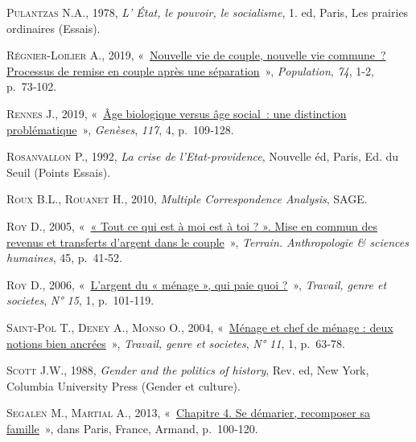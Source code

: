 \documentclass[
  12pt,
]{book}
\newlength{\cslhangindent}
\newenvironment{CSLReferences}[2] %
 {\begin{list}{}{%
  \setlength{\itemindent}{0pt}
  \setlength{\leftmargin}{0pt}
  \setlength{\parsep}{0pt}
  \ifodd #1
   \setlength{\leftmargin}{\cslhangindent}
   \setlength{\itemindent}{-1\cslhangindent}
  \fi
  \setlength{\itemsep}{#2\baselineskip}}}
 {\end{list}}
\begin{document}
\begin{CSLReferences}{0}{1}
\textsc{Pulantzas N.A.}, 1978, \emph{L' État, le pouvoir, le
socialisme}, 1. ed, Paris, Les prairies ordinaires (Essais).

\textsc{Régnier-Loilier A.}, 2019,
{«~\href{https://doi.org/10.3917/popu.1901.0073}{Nouvelle vie de couple,
nouvelle vie commune~? Processus de remise en couple après une
séparation}~»}, \emph{Population}, \emph{74}, 1-2, p.~73‑102.

\textsc{Rennes J.}, 2019,
{«~\href{https://doi.org/10.3917/gen.117.0109}{Âge biologique versus âge
social~: une distinction problématique}~»}, \emph{Genèses}, \emph{117},
4, p.~109‑128.

\textsc{Rosanvallon P.}, 1992, \emph{La crise de l'Etat-providence},
Nouvelle éd, Paris, Ed. du Seuil (Points Essais).

\textsc{Roux B.L.}, \textsc{Rouanet H.}, 2010, \emph{Multiple
Correspondence Analysis}, SAGE.

\textsc{Roy D.}, 2005, {«~\href{https://doi.org/10.4000/terrain.3530}{«
Tout ce qui est à moi est à toi ? ». Mise en commun des revenus et
transferts d{'}argent dans le couple}~»}, \emph{Terrain. Anthropologie
\& sciences humaines}, 45, p.~41‑52.

\textsc{Roy D.}, 2006,
{«~\href{http://www.cairn.info/revue-travail-genre-et-societes-2006-1-page-101.htm}{L'argent
du « ménage », qui paie quoi ?}~»}, \emph{Travail, genre et societes},
\emph{N° 15}, 1, p.~101‑119.

\textsc{Saint-Pol T.}, \textsc{Deney A.}, \textsc{Monso O.}, 2004,
{«~\href{https://www.cairn.info/revue-travail-genre-et-societes-2004-1-page-63.htm}{Ménage
et chef de ménage : deux notions bien ancrées}~»}, \emph{Travail, genre
et societes}, \emph{N° 11}, 1, p.~63‑78.

\textsc{Scott J.W.}, 1988, \emph{Gender and the politics of history},
Rev. ed, New York, Columbia University Press (Gender et culture).

\textsc{Segalen M.}, \textsc{Martial A.}, 2013,
{«~\href{http://www.cairn.info/sociologie-de-la-famille--9782200624743-page-100.htm}{Chapitre
4. Se démarier, recomposer sa famille}~»}, dans Paris, France, Armand,
p.~100‑120.


\end{CSLReferences}
\end{document}
